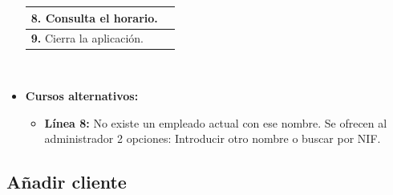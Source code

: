 \documentclass[spanish,a4paper,12pt]{report}	%
\begin{document}
\begin{itemize}
\begin{tabular}{|p{6cm}||p{6cm}|}
				 \textbf{8.} Consulta el horario.  & \textbf{}\\ \hline
				\textbf{9.} Cierra la aplicación. & \textbf{} \\ \hline
			\end{tabular}
			\\
			\item \textbf{Cursos alternativos:} 
			\begin{itemize}
			\item  \textbf{Línea 8:} No existe un empleado actual con ese nombre. Se ofrecen al administrador 2 opciones: Introducir otro nombre o buscar por NIF.
			\end {itemize}
		\end{itemize}%


	\hspace{-1.2 true cm}	
	\subsection{Añadir cliente}
		
\end{document}
